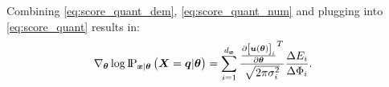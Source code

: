                       
Combining \eqref{eq:score_quant_dem}, \eqref{eq:score_quant_num} and plugging into \eqref{eq:score_quant} results in:
\begin{align}\label{eq:score_quant_p2}
\nabla_{\p}\log\pmft{\X=\vectorsym{q}|\p}{\x|\p}
    &=\sum_{i=1}^{\nx}\frac{\frac{\partial\squareb{\vectorsym{u}\brackets{\p}}_i}{\partial\p}^T}{\sqrt{2\pi\sigma^2_i}}\frac{\Delta E_i}{\Delta\Phi_i}.
\end{align}

